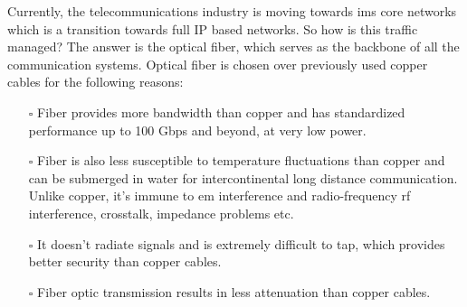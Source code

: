\documentclass[../report.tex]{subfiles}
\begin{document}
Currently, the telecommunications industry is moving towards \gls{ims} core networks which is a transition towards full IP based networks. So how is this traffic managed? The answer is the optical fiber, which serves as the backbone of all the communication systems. Optical fiber is chosen over previously used copper cables for the following reasons:
\begin{itemize}
	\item[$\square$] Fiber provides more bandwidth than copper and has standardized performance up to 100 Gbps and beyond, at very low power.
	\item[$\square$] Fiber is also less susceptible to temperature fluctuations than copper and can be submerged in water for intercontinental long distance communication. Unlike copper, it’s immune to \gls{em} interference and radio-frequency \gls{rf} interference, crosstalk, impedance problems etc. 
	\item[$\square$] It doesn’t radiate signals and is extremely difficult to tap, which provides better security than copper cables.
	\item[$\square$] Fiber optic transmission results in less attenuation than copper cables.
\end{itemize}
\end{document}
